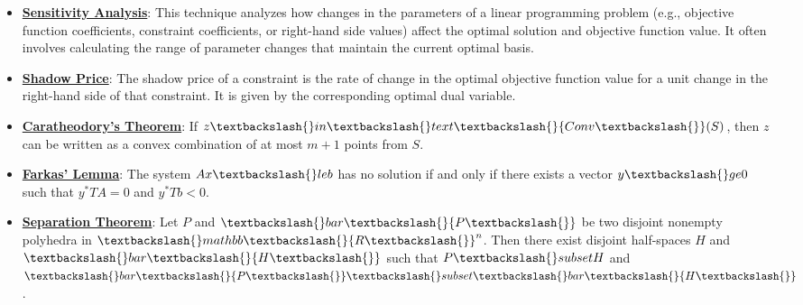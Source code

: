 \documentclass{article}%
\begin{document}
\begin{itemize}[leftmargin=*]%
\item \href{https://www.math.purdue.edu/~yipn/421/2024-10-01-SensitivityDuality.pdf#page=7}{\textbf{Sensitivity Analysis}}: This technique analyzes how changes in the parameters of a linear programming problem (e.g., objective function coefficients, constraint coefficients, or right-hand side values) affect the optimal solution and objective function value. It often involves calculating the range of parameter changes that maintain the current optimal basis.%
\item \href{https://www.math.purdue.edu/~yipn/421/2024-10-01-SensitivityDuality.pdf#page=10}{\textbf{Shadow Price}}: The shadow price of a constraint is the rate of change in the optimal objective function value for a unit change in the right-hand side of that constraint. It is given by the corresponding optimal dual variable.%
\end{itemize}%
\begin{itemize}[leftmargin=*]%
\item \href{https://www.math.purdue.edu/~yipn/421/2024-10-22-Convexity.pdf#page=8}{\textbf{Caratheodory's Theorem}}: If $z \textbackslash{}in \textbackslash{}text\textbackslash{}{Conv\textbackslash{}}(S)$, then $z$ can be written as a convex combination of at most $m+1$ points from $S$.%
\item \href{https://www.math.purdue.edu/~yipn/421/2024-10-22-Convexity.pdf#page=13}{\textbf{Farkas' Lemma}}: The system $Ax \textbackslash{}le b$ has no solution if and only if there exists a vector $y \textbackslash{}ge 0$ such that $y^*T A = 0$ and $y^*T b < 0$.%
\item \href{https://www.math.purdue.edu/~yipn/421/2024-10-22-Convexity.pdf#page=10}{\textbf{Separation Theorem}}: Let $P$ and $\textbackslash{}bar\textbackslash{}{P\textbackslash{}}$ be two disjoint nonempty polyhedra in $\textbackslash{}mathbb\textbackslash{}{R\textbackslash{}}^n$. Then there exist disjoint half-spaces $H$ and $\textbackslash{}bar\textbackslash{}{H\textbackslash{}}$ such that $P \textbackslash{}subset H$ and $\textbackslash{}bar\textbackslash{}{P\textbackslash{}} \textbackslash{}subset \textbackslash{}bar\textbackslash{}{H\textbackslash{}}$.%
\end{itemize}%
\end{document}
